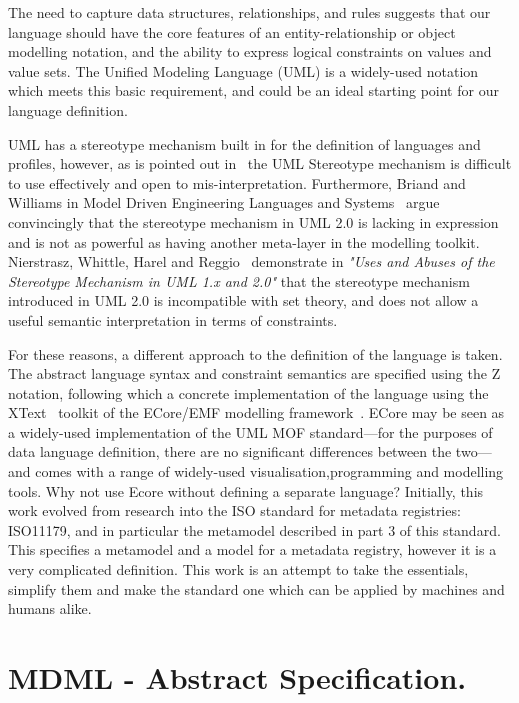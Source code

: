 \documentclass{article}
\begin{document}
		The need to capture data structures, relationships, and rules suggests that our language should have the core features of an entity-relationship or object modelling notation, and the ability to express logical constraints on values and value sets.  The Unified Modeling Language (UML) is a widely-used notation which meets this basic requirement, and could be an ideal starting point for our language definition. 
		
		UML has a stereotype mechanism built in for the definition of languages and profiles, however, as is pointed out in~\cite{stereouse} the UML Stereotype mechanism is difficult to use effectively and open to mis-interpretation. Furthermore, Briand and Williams in Model Driven Engineering Languages and Systems~\cite{modtools} argue convincingly that the stereotype mechanism in UML 2.0 is lacking in expression and is not as powerful as having another meta-layer in the modelling toolkit.  Nierstrasz, Whittle, Harel and Reggio~\cite{ustereo} demonstrate in \emph{"Uses and Abuses of the Stereotype Mechanism in UML 1.x and 2.0"} that the stereotype mechanism introduced in UML 2.0 is incompatible with set theory, and does not allow a useful semantic interpretation in terms of constraints.
		
		For these reasons, a different approach to the definition of the language is taken. The abstract language syntax and constraint semantics are specified using the Z notation, following which a concrete implementation of the language using the XText~\cite{XText} toolkit of the ECore/EMF modelling framework~\cite{ECORE}.  ECore may be seen as a widely-used implementation of the UML MOF standard---for the purposes of data language definition, there are no significant differences between the two---and comes with a range of widely-used visualisation,programming and modelling tools. Why not use Ecore without defining a separate language? Initially, this work evolved from research into the ISO standard for metadata registries: ISO11179, and in particular the metamodel described in part 3 of this standard. This specifies a metamodel and a model for a metadata registry, however it is a very complicated definition. This work is an attempt to take the essentials, simplify them and make the standard one which can be applied by machines and humans alike.
		
		
		\section{MDML - Abstract Specification.}
		
\end{document}
